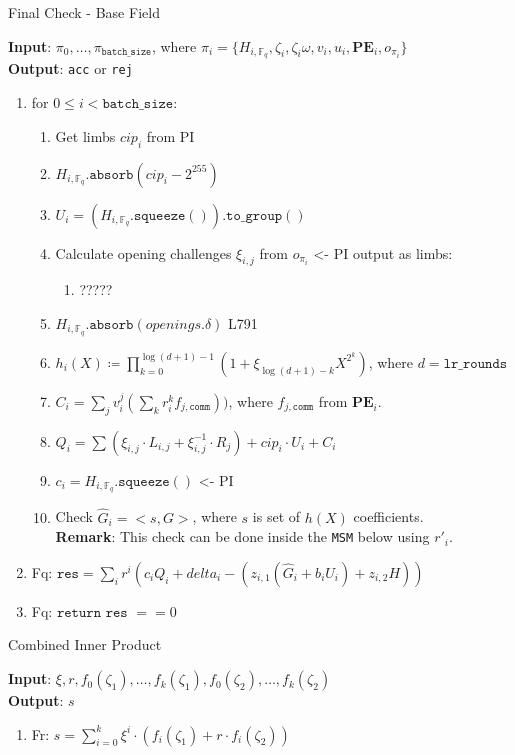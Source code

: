 \begin{algorithm}[H]
    \caption{Final Check - Base Field}
    \textbf{Input}: $\pi_0, \dots, \pi_{\texttt{batch\_size}}$, where $\pi_i = \{H_{i, \mathbb{F}_q}, \zeta_i, \zeta_i\omega, v_i, u_i,
    \textbf{PE}_i, o_{\pi_i} \}$ \\
    \textbf{Output}: \texttt{acc} or \texttt{rej}
    \begin{enumerate}
        \item for $0 \leq i < \texttt{batch\_size}$:
        \begin{enumerate}
        	\item Get limbs $cip_i$ from PI
            \item $H_{i, \mathbb{F}_q}.\texttt{absorb}(cip_i - 2^{255})$
            \item $U_i = (H_{i, \mathbb{F}_q}.\texttt{squeeze}()).\texttt{to\_group}()$
            \item Calculate opening challenges $\xi_{i, j}$ from $o_{\pi_i}$ <- PI output as limbs:
            \begin{enumerate}
            	\item ?????
            \end{enumerate}
            \item $H_{i, \mathbb{F}_q}.\texttt{absorb}(openings.\delta)$ L791
            \item $h_i(X) \coloneqq \prod_{k=0}^{\log(d+1) - 1}(1 + \xi_{\log(d+1)-k}X^{2^k})$, where $d = \texttt{lr\_rounds}$
            \item $C_i = \sum\limits_{j}v_i^j(\sum\limits_{k}r_i^k f_{j, \texttt{comm}}))$, where $f_{j, \texttt{comm}}$ from $\textbf{PE}_i$.
            \item $Q_i = \sum (\xi_{i, j} \cdot L_{i, j} + \xi_{i, j}^{-1} \cdot R_j) + cip_i \cdot U_i + C_i$
            \item $c_i = H_{i, \mathbb{F}_q}.\texttt{squeeze}()$ <- PI
            \item Check $\hat{G}_i = <s, G>$, where $s$ is set of $h(X)$ coefficients. \\
            \textbf{Remark}: This check can be done inside the \texttt{MSM} below using $r'_i$.
        \end{enumerate}
        \item Fq: $\texttt{res} = \sum\limits_i r^i (c_i Q_i + delta_i - ( z_{i, 1} (\hat{G}_i + b_i U_i) + z_{i, 2} H ))$
        \item Fq: $\texttt{return res } == 0$
    \end{enumerate}
\end{algorithm}

\begin{algorithm}[H]
    \caption{Combined Inner Product}
    \textbf{Input}: $\xi, r, f_0(\zeta_1), \dots, f_k(\zeta_1), f_0(\zeta_2), \dots, f_k(\zeta_2)$ \\ %
    \textbf{Output}: $s$
    \begin{enumerate}
        \item Fr: $s = \sum\limits_{i = 0}^{k} \xi^i \cdot (f_i(\zeta_1) + r \cdot f_i(\zeta_2))$
    \end{enumerate}
\end{algorithm}